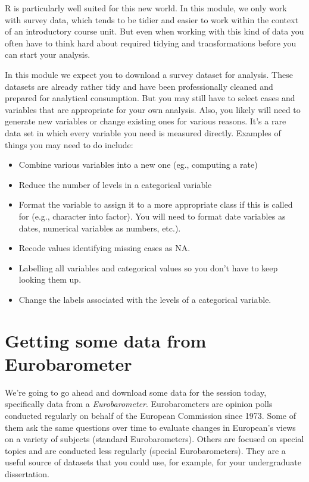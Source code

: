 \documentclass[
]{book}
\providecommand{\tightlist}{%
  \setlength{\itemsep}{0pt}\setlength{\parskip}{0pt}}
\begin{document}
R is particularly well suited for this new world. In this module, we only work with survey data, which tends to be tidier and easier to work within the context of an introductory course unit. But even when working with this kind of data you often have to think hard about required tidying and transformations before you can start your analysis.

In this module we expect you to download a survey dataset for analysis. These datasets are already rather tidy and have been professionally cleaned and prepared for analytical consumption. But you may still have to select cases and variables that are appropriate for your own analysis. Also, you likely will need to generate new variables or change existing ones for various reasons. It's a rare data set in which every variable you need is measured directly. Examples of things you may need to do include:

\begin{itemize}
\tightlist
\item
  Combine various variables into a new one (eg., computing a rate)
\item
  Reduce the number of levels in a categorical variable
\item
  Format the variable to assign it to a more appropriate class if this is called for (e.g., character into factor). You will need to format date variables as dates, numerical variables as numbers, etc.).
\item
  Recode values identifying missing cases as NA.
\item
  Labelling all variables and categorical values so you don't have to keep looking them up.
\item
  Change the labels associated with the levels of a categorical variable.
\end{itemize}

\section{Getting some data from Eurobarometer}\label{getting-some-data-from-eurobarometer}

We're going to go ahead and download some data for the session today, specifically data from a \emph{Eurobarometer}. Eurobarometers are opinion polls conducted regularly on behalf of the European Commission since 1973. Some of them ask the same questions over time to evaluate changes in European's views on a variety of subjects (standard Eurobarometers). Others are focused on special topics and are conducted less regularly (special Eurobarometers). They are a useful source of datasets that you could use, for example, for your undergraduate dissertation.
\end{document}
